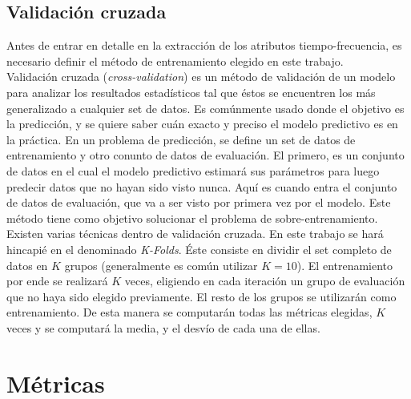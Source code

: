 \subsection*{Validación cruzada}

\indent Antes de entrar en detalle en la extracción de los atributos tiempo-frecuencia, es necesario definir el método de entrenamiento elegido en este trabajo. \\
\indent Validación cruzada (\textit{cross-validation}) es un método de validación de un modelo para analizar los resultados estadísticos tal que éstos se encuentren los más generalizado a cualquier set de datos. Es comúnmente usado donde el objetivo es la predicción, y se quiere saber cuán exacto y preciso el modelo predictivo es en la práctica. En un problema de predicción, se define un set de datos de entrenamiento y otro conunto de datos de evaluación. El primero, es un conjunto de datos en el cual el modelo predictivo estimará sus parámetros para luego predecir datos que no hayan sido visto nunca. Aquí es cuando entra el conjunto de datos de evaluación, que va a ser visto por primera vez por el modelo. Este método tiene como objetivo solucionar el problema de sobre-entrenamiento. \\
\indent Existen varias técnicas dentro de validación cruzada. En este trabajo se hará hincapié en el denominado \textit{K-Folds}. Éste consiste en dividir el set completo de datos en $K$ grupos (generalmente es común utilizar $K = 10$). El entrenamiento por ende se realizará $K$ veces, eligiendo en cada iteración un grupo de evaluación que no haya sido elegido previamente. El resto de los grupos se utilizarán como entrenamiento. De esta manera se computarán todas las métricas elegidas, $K$ veces y se computará la media, y el desvío de cada una de ellas.

\section{Métricas}

